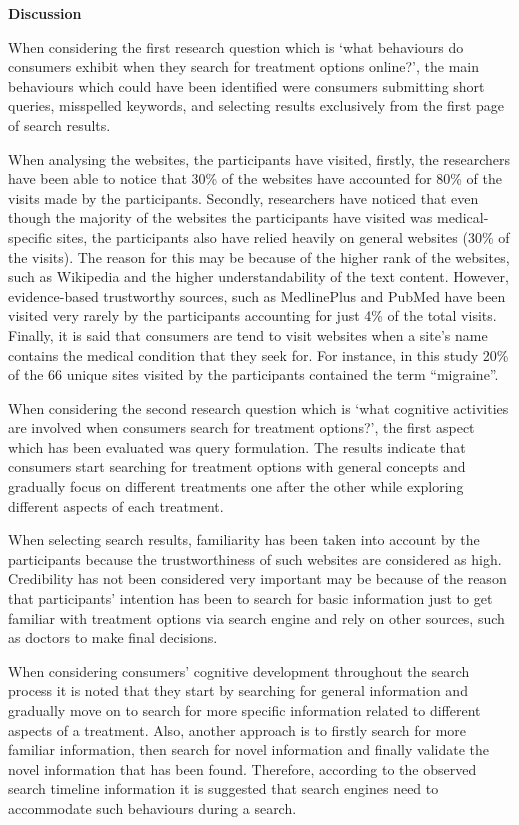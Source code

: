 \documentclass[]{article}
\begin{document}
\textbf{Discussion}

When considering the first research question which is ‘what behaviours do consumers exhibit when they search for treatment options online?’, the main behaviours which could have been identified were consumers submitting short queries, misspelled keywords, and selecting results exclusively from the first page of search results. 

When analysing the websites, the participants have visited, firstly, the researchers have been able to notice that 30\% of the websites have accounted for 80\% of the visits made by the participants. Secondly, researchers have noticed that even though the majority of the websites the participants have visited was medical-specific sites, the participants also have relied heavily on general websites (30\% of the visits). The reason for this may be because of the higher rank of the websites, such as Wikipedia and the higher understandability of the text content. However, evidence-based trustworthy sources, such as MedlinePlus and PubMed have been visited very rarely by the participants accounting for just 4\% of the total visits. Finally, it is said that consumers are tend to visit websites when a site’s name contains the medical condition that they seek for. For instance, in this study 20\% of the 66 unique sites visited by the participants contained the term “migraine”.  

When considering the second research question which is ‘what cognitive activities are involved when consumers search for treatment options?’, the first aspect which has been evaluated was query formulation. The results indicate that consumers start searching for treatment options with general concepts and gradually focus on different treatments one after the other while exploring different aspects of each treatment.
 
When selecting search results, familiarity has been taken into account by the participants because the trustworthiness of such websites are considered as high. Credibility has not been considered very important may be because of the reason that participants’ intention has been to search for basic information just to get familiar with treatment options via search engine and rely on other sources, such as doctors to make final decisions.

When considering consumers’ cognitive development throughout the search process it is noted that they start by searching for general information and gradually move on to search for more specific information related to different aspects of a treatment. Also, another approach is to firstly search for more familiar information, then search for novel information and finally validate the novel information that has been found. Therefore, according to the observed search timeline information it is suggested that search engines need to accommodate such behaviours during a search. 
\end{document}
